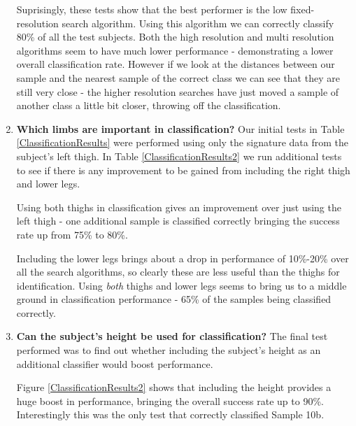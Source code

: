 \begin{enumerate}
		Suprisingly, these tests show that the best performer is the low fixed-resolution search algorithm.
		Using this algorithm we can correctly classify 80\% of all the test subjects.
		Both the high resolution and multi resolution algorithms seem to have much lower performance - demonstrating a lower overall classification rate.
		However if we look at the distances between our sample and the nearest sample of the correct class we can see that they are still very close - the higher resolution searches
		have just moved a sample of another class a little bit closer, throwing off the classification.
		
	\item \textbf{Which limbs are important in classification?}
		Our initial tests in Table \ref{ClassificationResults} were performed using only the signature data from the subject's left thigh.
		In Table \ref{ClassificationResults2} we run additional tests to see if there is any improvement to be gained from including the right thigh and lower legs.
		
		Using both thighs in classification gives an improvement over just using the left thigh - one additional sample is classified correctly bringing the success rate up from 75\% to 80\%.
		
		Including the lower legs brings about a drop in performance of 10\%-20\% over all the search algorithms, so clearly these are less useful than the thighs for identification.
		Using \emph{both} thighs and lower legs seems to bring us to a middle ground in classification performance - 65\% of the samples being classified correctly.
	
	\item \textbf{Can the subject's height be used for classification?}
		The final test performed was to find out whether including the subject's height as an additional classifier would boost performance.
		
		Figure \ref{ClassificationResults2} shows that including the height provides a huge boost in performance, bringing the overall success rate up to 90\%.
		Interestingly this was the only test that correctly classified Sample 10b.
\end{enumerate}

